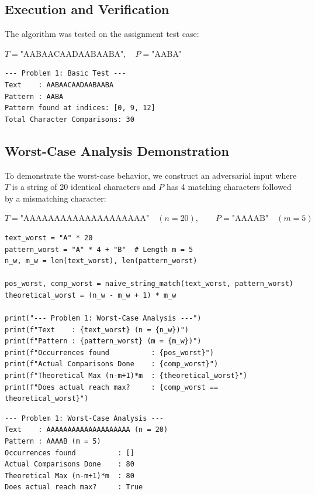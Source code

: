 \documentclass[12pt]{article}
\begin{document}
\subsection{Execution and Verification}
The algorithm was tested on the assignment test case:
\begin{center}
$T = \text{"AABAACAADAABAABA"}, \quad P = \text{"AABA"}$
\end{center}

\begin{lstlisting}[style=output, caption={Problem 1 Execution Output on Sample Input}]
--- Problem 1: Basic Test ---
Text    : AABAACAADAABAABA
Pattern : AABA
Pattern found at indices: [0, 9, 12]
Total Character Comparisons: 30
\end{lstlisting}

\subsection{Worst-Case Analysis Demonstration}
To demonstrate the worst-case behavior, we construct an adversarial input where $T$ is a string of 20 identical characters and $P$ has 4 matching characters followed by a mismatching character:
\begin{center}
$T = \text{"AAAAAAAAAAAAAAAAAAAA"} \quad (n = 20), \qquad P = \text{"AAAAB"} \quad (m = 5)$
\end{center}

\begin{lstlisting}[style=code, caption={Worst-Case Input Experiment}]
text_worst = "A" * 20
pattern_worst = "A" * 4 + "B"  # Length m = 5
n_w, m_w = len(text_worst), len(pattern_worst)

pos_worst, comp_worst = naive_string_match(text_worst, pattern_worst)
theoretical_worst = (n_w - m_w + 1) * m_w

print("--- Problem 1: Worst-Case Analysis ---")
print(f"Text    : {text_worst} (n = {n_w})")
print(f"Pattern : {pattern_worst} (m = {m_w})")
print(f"Occurrences found          : {pos_worst}")
print(f"Actual Comparisons Done    : {comp_worst}")
print(f"Theoretical Max (n-m+1)*m  : {theoretical_worst}")
print(f"Does actual reach max?     : {comp_worst == theoretical_worst}")
\end{lstlisting}

\begin{lstlisting}[style=output, caption={Problem 1 Worst-Case Execution Output}]
--- Problem 1: Worst-Case Analysis ---
Text    : AAAAAAAAAAAAAAAAAAAA (n = 20)
Pattern : AAAAB (m = 5)
Occurrences found          : []
Actual Comparisons Done    : 80
Theoretical Max (n-m+1)*m  : 80
Does actual reach max?     : True
\end{lstlisting}
\end{document}

